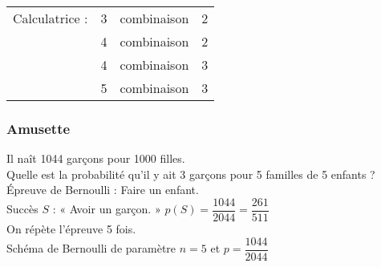 \textcolor{orange} {\begin{tabular}{lccc}
Calculatrice : & 3 & combinaison & 2 \\
& 4 & combinaison & 2 \\
& 4 & combinaison & 3 \\
& 5 & combinaison & 3 \\
\end{tabular}}

\vspace*{.3cm}

\makeatletter
\newcommand\binomialCoefficient[2]{%
    \c@pgf@counta=#1%
    \c@pgf@countb=#2%
    \c@pgf@countc=\c@pgf@counta%
    \advance\c@pgf@countc by-\c@pgf@countb%
    \ifnum\c@pgf@countb>\c@pgf@countc%
        \c@pgf@countb=\c@pgf@countc%
    \fi%
    \c@pgf@countc=1%
    \c@pgf@countd=0%
    \pgfmathloop%
        \ifnum\c@pgf@countd<\c@pgf@countb%
        \multiply\c@pgf@countc by\c@pgf@counta%
        \advance\c@pgf@counta by-1%
        \advance\c@pgf@countd by1%
        \divide\c@pgf@countc by\c@pgf@countd%
    \repeatpgfmathloop%
    \the\c@pgf@countc%
}
\makeatother


\newpage

\subsubsection{Amusette}

Il naît 1044 garçons pour 1000 filles. \\ Quelle est la probabilité qu'il y ait 3 garçons pour 5 familles de 5 enfants ? \\

Épreuve de Bernoulli : Faire un enfant. \\

Succès $S$ : « Avoir un garçon. » $p\left(S\right) = \dfrac{1044}{2044} = \dfrac{261}{511} $ \\

On répète l'épreuve 5 fois. \\

Schéma de Bernoulli de paramètre $n = 5 $ et $p = \dfrac{1044}{2044} $ \\

